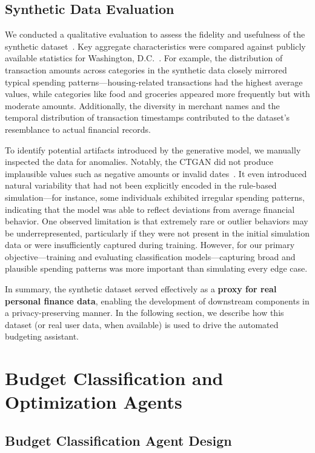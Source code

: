 \documentclass[conference]{IEEEtran}
\begin{document}
\subsection{Synthetic Data Evaluation}
We conducted a qualitative evaluation to assess the fidelity and usefulness of the synthetic dataset~\cite{eaves2024}. Key aggregate characteristics were compared against publicly available statistics for Washington, D.C.~\cite{acsdata}. For example, the distribution of transaction amounts across categories in the synthetic data closely mirrored typical spending patterns—housing-related transactions had the highest average values, while categories like food and groceries appeared more frequently but with moderate amounts. Additionally, the diversity in merchant names and the temporal distribution of transaction timestamps contributed to the dataset’s resemblance to actual financial records.

To identify potential artifacts introduced by the generative model, we manually inspected the data for anomalies. Notably, the CTGAN did not produce implausible values such as negative amounts or invalid dates~\cite{ctgan2019}. It even introduced natural variability that had not been explicitly encoded in the rule-based simulation—for instance, some individuals exhibited irregular spending patterns, indicating that the model was able to reflect deviations from average financial behavior. One observed limitation is that extremely rare or outlier behaviors may be underrepresented, particularly if they were not present in the initial simulation data or were insufficiently captured during training. However, for our primary objective—training and evaluating classification models—capturing broad and plausible spending patterns was more important than simulating every edge case.

In summary, the synthetic dataset served effectively as a \textbf{proxy for real personal finance data}, enabling the development of downstream components in a privacy-preserving manner. In the following section, we describe how this dataset (or real user data, when available) is used to drive the automated budgeting assistant.





\section{Budget Classification and Optimization Agents}

\subsection{Budget Classification Agent Design}
\end{document}
